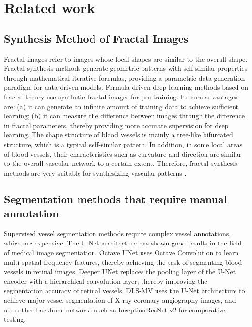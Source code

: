 \section{Related work}
\label{sec:formatting}

\subsection{Synthesis Method of Fractal Images}

Fractal images refer to images whose local shapes are similar to the overall shape. 
Fractal synthesis methods generate geometric patterns with self-similar properties through mathematical iterative formulas, 
providing a parametric data generation paradigm for data-driven models. 
Formula-driven deep learning methods based on fractal theory \cite{01.04.DataBase}\cite{01.05.without_Natural_Images} use synthetic fractal images for pre-training. Its core advantages are: (a) it can generate an infinite amount of training data to achieve sufficient learning; (b) it can measure the difference between images through the difference in fractal parameters, thereby providing more accurate supervision for deep learning. The shape structure of blood vessels is mainly a tree-like bifurcated structure, which is a typical self-similar pattern. In addition, in some local areas of blood vessels, their characteristics such as curvature and direction are similar to the overall vascular network to a certain extent. Therefore, fractal synthesis methods are very suitable for synthesizing vascular patterns \cite{01.02.SSVS}.

\subsection{Segmentation methods that require manual annotation}

Supervised vessel segmentation methods require complex vessel annotations, which are expensive. The U-Net\cite{FC.32.U-Net} architecture has shown good results in the field of medical image segmentation. Octave UNet\cite{SSVS.8} uses Octave Convolution to learn multi-spatial frequency features, thereby achieving the task of segmenting blood vessels in retinal images. Deeper UNet\cite{SSVS.33} replaces the pooling layer of the U-Net encoder with a hierarchical convolution layer, thereby improving the segmentation accuracy of retinal vessels. DLS-MV\cite{SSVS.36} uses the U-Net architecture to achieve major vessel segmentation of X-ray coronary angiography images, and uses other backbone networks such as InceptionResNet-v2 for comparative testing.

